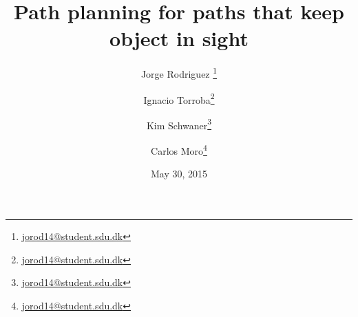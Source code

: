 
\title{Path planning for paths that keep object in sight}
\date{May 30, 2015}
\author{Jorge Rodriguez \thanks{\url{jorod14@student.sdu.dk}}}
\author{Ignacio Torroba\thanks{\url{jorod14@student.sdu.dk}}}
\author{Kim Schwaner\thanks{\url{jorod14@student.sdu.dk}}}
\author{Carlos Moro\thanks{\url{jorod14@student.sdu.dk}}}
